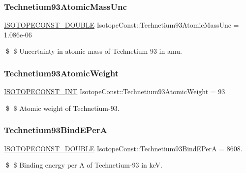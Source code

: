 \subsubsection{\texorpdfstring{Technetium93\+Atomic\+Mass\+Unc}{Technetium93AtomicMassUnc}}
{\footnotesize\ttfamily \mbox{\hyperlink{group___isotope_const-_macros_ga8f45a7272ce02c0b4c65c44636ed719a}{I\+S\+O\+T\+O\+P\+E\+C\+O\+N\+S\+T\+\_\+\+D\+O\+U\+B\+LE}} Isotope\+Const\+::\+Technetium93\+Atomic\+Mass\+Unc = 1.\+086e-\/06}

\$ \$ Uncertainty in atomic mass of Technetium-\/93 in amu. \mbox{\label{group___isotope_const-_technetium-_tc93_ga72a52e61b07156ac367dad0bcc0ec991}} 
\subsubsection{\texorpdfstring{Technetium93\+Atomic\+Weight}{Technetium93AtomicWeight}}
{\footnotesize\ttfamily \mbox{\hyperlink{group___isotope_const-_macros_ga5f18360b3e99483a35c32d789e62621c}{I\+S\+O\+T\+O\+P\+E\+C\+O\+N\+S\+T\+\_\+\+I\+NT}} Isotope\+Const\+::\+Technetium93\+Atomic\+Weight = 93}

\$ \$ Atomic weight of Technetium-\/93. \mbox{\label{group___isotope_const-_technetium-_tc93_ga5df16095451d71a42bea71ad4302843f}} 
\subsubsection{\texorpdfstring{Technetium93\+Bind\+E\+PerA}{Technetium93BindEPerA}}
{\footnotesize\ttfamily \mbox{\hyperlink{group___isotope_const-_macros_ga8f45a7272ce02c0b4c65c44636ed719a}{I\+S\+O\+T\+O\+P\+E\+C\+O\+N\+S\+T\+\_\+\+D\+O\+U\+B\+LE}} Isotope\+Const\+::\+Technetium93\+Bind\+E\+PerA = 8608.}

\$ \$ Binding energy per A of Technetium-\/93 in keV. \mbox{\label{group___isotope_const-_technetium-_tc93_gaa7068de76ed964926f5fff6cef633d12}} 
